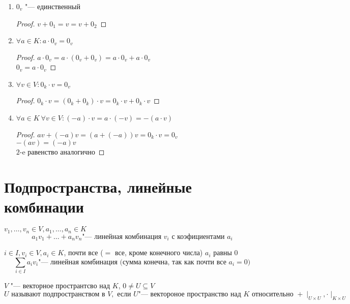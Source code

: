 \begin{enumerate}
	\item
		$0_v$ "--- единственный
		\begin{proof}
			$v + 0_1 = v = v + 0_2$
		\end{proof}
	\item
		$\forall a \in K \colon a \cdot 0_v = 0_v$
		\begin{proof}
			$a \cdot 0_v = a \cdot (0_v + 0_v) = a \cdot 0_v + a \cdot 0_v$ \\
			$0_v = a \cdot 0_v$
		\end{proof}
	\item
		$\forall v \in V \colon 0_k \cdot v = 0_v$
		\begin{proof}
			$0_k \cdot v = (0_k + 0_k) \cdot v = 0_k \cdot v + 0_k \cdot v$
		\end{proof}
	\item
		$\forall a \in K ~ \forall v \in V \colon (-a) \cdot v = a \cdot (-v) = -(a \cdot v)$
		\begin{proof}
			$av + (-a)v = (a + (-a))v = 0_k \cdot v = 0_v$ \\
			$-(av) = (-a)v$\\
			$2$-e равенство аналогично
		\end{proof}
\end{enumerate}

\section{Подпространства, линейные комбинации}

\begin{Def}
	$v_1, \dots, v_n \in V, a_1, \dots, a_n \in K$
	\[ a_1v_1 + \dots + a_nv_n \text{"--- линейная комбинация $v_i$ с коэфициентами $a_i$} \]
\end{Def}

\begin{Def}
	$i \in I, v_i \in V, a_i \in K$, почти все ($=$ все, кроме конечного числа) $a_i$ равны $0$
	\[ \sum_{i \in I} a_iv_i \text{"--- линейная комбинация (сумма конечна, так как почти все $a_i = 0$)} \]
\end{Def}

\begin{Def}
	$V$ "--- векторное пространтсво над $K$, $0 \neq U \subseteq V$ \\
	\[U \text{ называют подпространством в } V, \text{ если } U \text{"--- вектороное пространство над } K \text{ относительно } + \mid_{U \times U}, \cdot \mid_{K \times U}\]
\end{Def}

